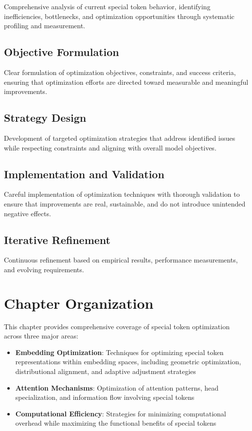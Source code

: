 Comprehensive analysis of current special token behavior, identifying inefficiencies, bottlenecks, and optimization opportunities through systematic profiling and measurement.

\subsection{Objective Formulation}

Clear formulation of optimization objectives, constraints, and success criteria, ensuring that optimization efforts are directed toward measurable and meaningful improvements.

\subsection{Strategy Design}

Development of targeted optimization strategies that address identified issues while respecting constraints and aligning with overall model objectives.

\subsection{Implementation and Validation}

Careful implementation of optimization techniques with thorough validation to ensure that improvements are real, sustainable, and do not introduce unintended negative effects.

\subsection{Iterative Refinement}

Continuous refinement based on empirical results, performance measurements, and evolving requirements.

\section{Chapter Organization}

This chapter provides comprehensive coverage of special token optimization across three major areas:

\begin{itemize}
\item \textbf{Embedding Optimization}: Techniques for optimizing special token representations within embedding spaces, including geometric optimization, distributional alignment, and adaptive adjustment strategies
\item \textbf{Attention Mechanisms}: Optimization of attention patterns, head specialization, and information flow involving special tokens
\item \textbf{Computational Efficiency}: Strategies for minimizing computational overhead while maximizing the functional benefits of special tokens
\end{itemize}

